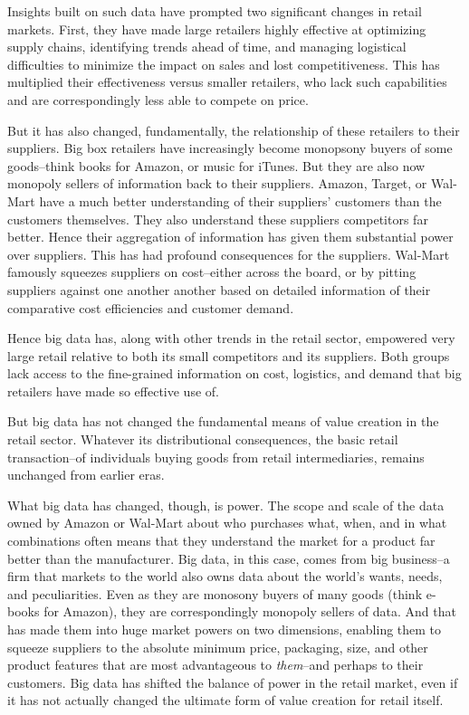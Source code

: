 \documentclass[12pt]{article}
\begin{document}
Insights built on such data have prompted two significant changes in
retail markets. First, they have made large retailers highly effective at
optimizing supply chains, identifying trends ahead of time, and
managing logistical difficulties to minimize the impact on sales and
lost competitiveness. This has multiplied their effectiveness versus
smaller retailers, who lack such capabilities and are correspondingly
less able to compete on price. 

But it has also changed, fundamentally, the relationship of these
retailers to their suppliers. Big box retailers have increasingly
become monopsony buyers of some goods--think books for Amazon, or
music for iTunes. But they are also now monopoly sellers of
information back to their suppliers. Amazon, Target, or Wal-Mart have
a much better understanding of their suppliers' customers than the
customers themselves. They also understand these suppliers competitors
far better. Hence their aggregation of information has given them
substantial power over suppliers. This has had profound consequences
for the suppliers. Wal-Mart famously squeezes suppliers on
cost--either across the board, or by pitting suppliers against one
another another based on detailed information of their comparative
cost efficiencies and customer demand.

Hence big data has, along with other trends in the retail sector,
empowered very large retail relative to both its small competitors and
its suppliers. Both groups lack access to the fine-grained information
on cost, logistics, and demand that big retailers have made so
effective use of. 

But big data has not changed the fundamental means of value creation
in the retail sector. Whatever its distributional consequences, the
basic retail transaction--of individuals buying goods from retail
intermediaries, remains unchanged from earlier eras. 

What big data has changed, though, is power. The scope and scale of
the data owned by Amazon or Wal-Mart about who purchases what, when,
and in what combinations often means that they understand the market
for a product far better than the manufacturer. Big data, in this
case, comes from big business--a firm that markets to the world also
owns data about the world's wants, needs, and peculiarities. Even as
they are monosony buyers of many goods (think e-books for Amazon),
they are correspondingly monopoly sellers of data. And that has made
them into huge market powers on two dimensions, enabling them to
squeeze suppliers to the absolute minimum price, packaging, size, and
other product features that are most advantageous to
\textit{them}--and perhaps to their customers. Big data has shifted
the balance of power in the retail market, even if it has not actually
changed the ultimate form of value creation for retail itself.
\end{document}
